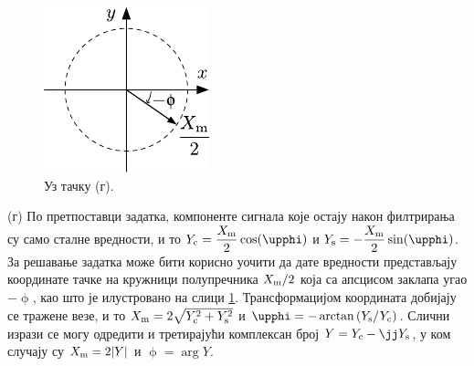 \begin{figure}
    \includegraphics{fig/zIQ_resenje.pdf}
    \caption{Уз тачку (г).}
    \label{fig:\ID.uzg}
\end{figure}
(г) По претпоставци задатка, компоненте сигнала које остају након филтрирања су  
само сталне вредности, и то 
$Y_{\rm c} = \dfrac{X_{\rm m}}{2}\cos(\upphi)$ и 
$Y_{\rm s} = -\dfrac{X_{\rm m}}{2}\sin(\upphi)$. 
За решавање задатка може бити корисно уочити  да дате вредности представљају координате тачке 
на кружници полупречника $X_{\rm m}/2$ која са апсцисом заклапа угао $-\upphi$, као што је 
илустровано на слици \ref{fig:\ID.uzg}. Трансформацијом координата добијају се тражене везе, 
и то $X_{\rm m} = 2\sqrt{Y_{\rm c}^2 + Y_{\rm s}^2}$ и 
$\upphi = -\arctan\left(Y_{\rm s}/Y_{\rm c}\right)$. Слични изрази се могу одредити и
третирајући комплексан број $Y = Y_{\rm c} - \jj Y_{\rm s}$, у ком случају су 
$X_{\rm m} = 2 |Y|$ и $\upphi = \arg Y$. 

